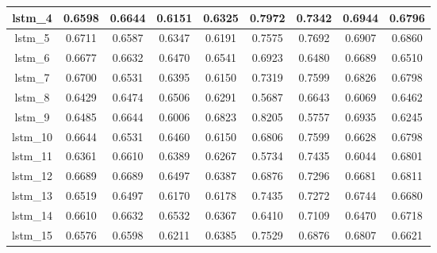 \begin{table}[p]
\begin{tabular} {|c|c|c|c|c|c|c|c|c| }
        lstm\_4  & 0.6598                        & 0.6644                         & 0.6151                      & 0.6325                  & 0.7972 & 0.7342 & 0.6944 & 0.6796 \\ \hline
        lstm\_5  & 0.6711                        & 0.6587                         & 0.6347                      & 0.6191                  & 0.7575 & 0.7692 & 0.6907 & 0.6860 \\ \hline
        lstm\_6  & 0.6677                        & 0.6632                         & 0.6470                      & 0.6541                  & 0.6923 & 0.6480 & 0.6689 & 0.6510 \\ \hline
        lstm\_7  & 0.6700                        & 0.6531                         & 0.6395                      & 0.6150                  & 0.7319 & 0.7599 & 0.6826 & 0.6798 \\ \hline
        lstm\_8  & 0.6429                        & 0.6474                         & 0.6506                      & 0.6291                  & 0.5687 & 0.6643 & 0.6069 & 0.6462 \\ \hline
        lstm\_9  & 0.6485                        & 0.6644                         & 0.6006                      & 0.6823                  & 0.8205 & 0.5757 & 0.6935 & 0.6245 \\ \hline
        lstm\_10 & 0.6644                        & 0.6531                         & 0.6460                      & 0.6150                  & 0.6806 & 0.7599 & 0.6628 & 0.6798 \\ \hline
        lstm\_11 & 0.6361                        & 0.6610                         & 0.6389                      & 0.6267                  & 0.5734 & 0.7435 & 0.6044 & 0.6801 \\ \hline
        lstm\_12 & 0.6689                        & 0.6689                         & 0.6497                      & 0.6387                  & 0.6876 & 0.7296 & 0.6681 & 0.6811 \\ \hline
        lstm\_13 & 0.6519                        & 0.6497                         & 0.6170                      & 0.6178                  & 0.7435 & 0.7272 & 0.6744 & 0.6680 \\ \hline
        lstm\_14 & 0.6610                        & 0.6632                         & 0.6532                      & 0.6367                  & 0.6410 & 0.7109 & 0.6470 & 0.6718 \\ \hline
        lstm\_15 & 0.6576                        & 0.6598                         & 0.6211                      & 0.6385                  & 0.7529 & 0.6876 & 0.6807 & 0.6621 \\ \hline

\end{tabular}
\end{table}
